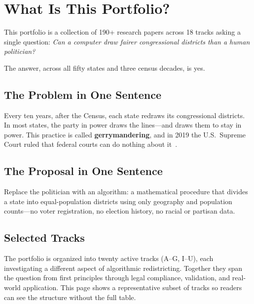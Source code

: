 
\section{What Is This Portfolio?}

This portfolio is a collection of 190+ research papers across 18 tracks asking a single question:
\emph{Can a computer draw fairer congressional districts than a human politician?}

The answer, across all fifty states and three census decades, is yes.

\subsection*{The Problem in One Sentence}

Every ten years, after the Census, each state redraws its congressional districts.
In most states, the party in power draws the lines---and draws them to stay in power.
This practice is called \textbf{gerrymandering}, and in 2019 the U.S.\ Supreme Court
ruled that federal courts can do nothing about it~\cite{rucho2019}.

\subsection*{The Proposal in One Sentence}

Replace the politician with an algorithm: a mathematical procedure that divides a
state into equal-population districts using only geography and population counts---no
voter registration, no election history, no racial or partisan data.

\subsection*{Selected Tracks}

The portfolio is organized into twenty active tracks (A--G, I--U),
each investigating a different aspect of algorithmic redistricting.
Together they span the question from first principles through
legal compliance, validation, and real-world application. This page
shows a representative subset of tracks so readers can see the structure
without the full table.

